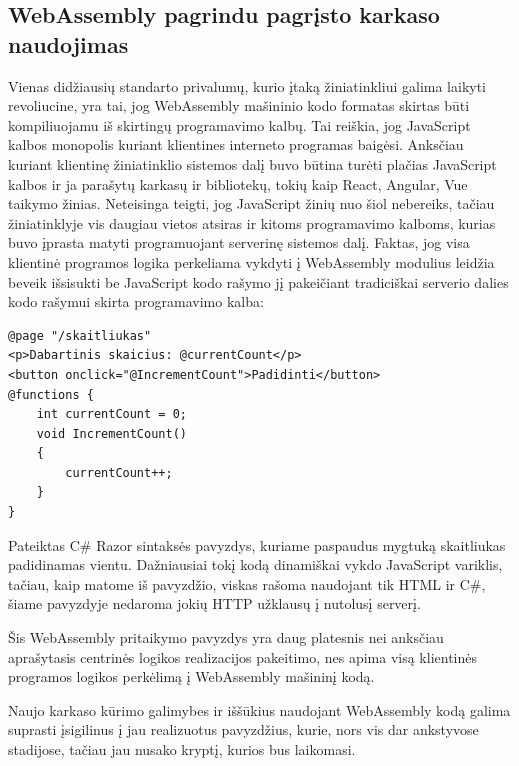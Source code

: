 \documentclass{VUMIFPSkursinis}
\begin{document}
\subsection{WebAssembly pagrindu pagrįsto karkaso naudojimas}
Vienas didžiausių standarto privalumų, kurio įtaką žiniatinkliui galima laikyti revoliucine, yra tai, jog WebAssembly mašininio kodo formatas skirtas būti kompiliuojamu iš skirtingų programavimo kalbų. Tai reiškia, jog JavaScript kalbos monopolis kuriant klientines interneto programas baigėsi. Anksčiau kuriant klientinę žiniatinklio sistemos dalį buvo būtina turėti plačias JavaScript kalbos ir ja parašytų karkasų ir bibliotekų, tokių kaip React, Angular, Vue taikymo žinias. Neteisinga teigti, jog JavaScript žinių nuo šiol nebereiks, tačiau žiniatinklyje vis daugiau vietos atsiras ir kitoms programavimo kalboms, kurias buvo įprasta matyti programuojant serverinę sistemos dalį. Faktas, jog visa klientinė programos logika perkeliama vykdyti į WebAssembly modulius leidžia beveik išsisukti be JavaScript kodo rašymo jį pakeičiant tradiciškai serverio dalies kodo rašymui skirta programavimo kalba:

\begin{center}
\begin{small}
\begin{verbatim}
@page "/skaitliukas"
<p>Dabartinis skaicius: @currentCount</p>
<button onclick="@IncrementCount">Padidinti</button>
@functions {
    int currentCount = 0;
    void IncrementCount()
    {
        currentCount++;
    }
}
\end{verbatim}
\end{small}
\end{center}Pateiktas C\# Razor sintaksės pavyzdys, kuriame paspaudus mygtuką skaitliukas padidinamas vientu. Dažniausiai tokį kodą dinamiškai vykdo JavaScript variklis, tačiau, kaip matome iš pavyzdžio, viskas rašoma naudojant tik HTML ir C\#, šiame pavyzdyje nedaroma jokių HTTP užklausų į nutolusį serverį.

Šis WebAssembly pritaikymo pavyzdys yra daug platesnis nei anksčiau aprašytasis centrinės logikos realizacijos pakeitimo, nes apima visą klientinės programos logikos perkėlimą į WebAssembly mašininį kodą.

Naujo karkaso kūrimo galimybes ir iššūkius naudojant WebAssembly kodą galima suprasti įsigilinus į jau realizuotus pavyzdžius, kurie, nors vis dar ankstyvose stadijose, tačiau jau nusako kryptį, kurios bus laikomasi.
\end{document}
